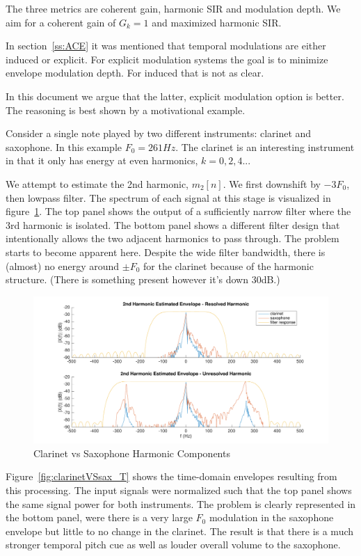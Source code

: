 \documentclass [11pt, proquest,oneside] {ganter_thesis}[2015/03/03]
\begin{document}
The three metrics are coherent gain, harmonic SIR and modulation depth.  We aim for a coherent gain of $G_k = 1$ and maximized harmonic SIR.

In section~\ref{ss:ACE} it was mentioned that temporal modulations are either induced or explicit.  For explicit modulation systems the goal is to minimize envelope modulation depth.  For induced that is not as clear.

In this document we argue that the latter, explicit modulation option is better.  The reasoning is best shown by a motivational example.

Consider a single note played by two different instruments: clarinet and saxophone.  In this example $F_0 = 261Hz$.  The clarinet is an interesting instrument in that it only has energy at even harmonics, $k = 0, 2, 4...$

We attempt to estimate the 2nd harmonic, $m_2[n]$.  We first downshift by $-3F_0$, then lowpass filter.  The spectrum of each signal at this stage is visualized in figure~\ref{fig:clarinetVSsax_F}.  The top panel shows the output of a sufficiently narrow filter where the 3rd harmonic is isolated.  The bottom panel shows a different filter design that intentionally allows the two adjacent harmonics to pass through.  The problem starts to become apparent here.  Despite the wide filter bandwidth, there is (almost) no energy around $\pm F_0$ for the clarinet because of the harmonic structure.  (There is something present however it's down 30dB.)

\begin{figure}[!ht]
  \centering
    \includegraphics[width=1\textwidth]{matlab/clarinetVSsax_F}
    \caption{Clarinet vs Saxophone Harmonic Components}\label{fig:clarinetVSsax_F}
\end{figure}

Figure~\ref{fig:clarinetVSsax_T} shows the time-domain envelopes resulting from this processing.  The input signals were normalized such that the top panel shows the same signal power for both instruments.  The problem is clearly represented in the bottom panel, were there is a very large $F_0$ modulation in the saxophone envelope but little to no change in the clarinet.  The result is that there is a much stronger temporal pitch cue as well as louder overall volume to the saxophone.
\end{document}
